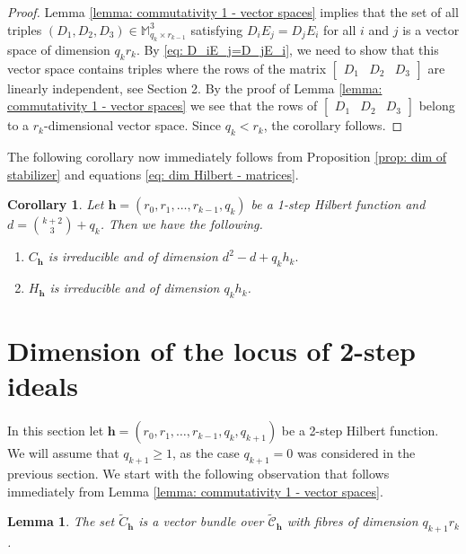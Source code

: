 \documentclass[11pt]{amsart}
\newtheorem{lemma}[thm]{Lemma}
\newtheorem{cor}[thm]{Corollary}
\theoremstyle{definition}
\newcommand{\h}{\mathbf{h}}
\newcommand{\tC}{\widetilde{C}}
\newcommand{\tcC}{\widetilde{\mathscr{C}}}
\begin{document}
\begin{proof}
Lemma \ref{lemma: commutativity 1 - vector spaces} implies that the set of all triples $(D_1,D_2,D_3)\in \mathbb{M}_{q_k\times r_{k-1}}^3$ satisfying $D_iE_j=D_jE_i$ for all $i$ and $j$ is a vector space of dimension $q_kr_k$. By \eqref{eq: D_iE_j=D_jE_i}, we need to show that this vector space contains triples where the rows of the matrix $\begin{bmatrix}D_1 & D_2 & D_3\end{bmatrix}$ are linearly independent, see Section 2. By the proof of Lemma \ref{lemma: commutativity 1 - vector spaces} we see that the rows of $\begin{bmatrix}D_1 & D_2 & D_3\end{bmatrix}$ belong to a $r_k$-dimensional vector space. Since $q_k<r_k$, the corollary follows.
\end{proof}

The following corollary now immediately follows from Proposition \ref{prop: dim of stabilizer} and equations \eqref{eq: dim Hilbert - matrices}.

\begin{cor}\label{cor: dim 1-step orbit, ideals}
Let $\h=(r_0,r_1,\ldots ,r_{k-1},q_k)$ be a 1-step Hilbert function and $d={k+2\choose 3}+q_k$. Then we have the following.
\begin{enumerate}
\item
$C_\h$ is irreducible and of dimension $d^2-d+q_kh_k.$
\item
$H_\h$ is irreducible and of dimension $q_kh_k$.
\end{enumerate}
\end{cor}


\section{Dimension of the locus of 2-step ideals}

In this section let $\h=(r_0,r_1,\ldots ,r_{k-1},q_k,q_{k+1})$ be a 2-step Hilbert function. We will assume that $q_{k+1}\ge 1$, as the case $q_{k+1}=0$ was considered in the previous section. We start with the following observation that follows immediately from Lemma \ref{lemma: commutativity 1 - vector spaces}.

\begin{lemma}\label{lemma: vector bundle over homogeneous locus}
The set $\tC_\h$ is a vector bundle over $\tcC_ \h$ with fibres of dimension $q_{k+1}r_k$.
\end{lemma}
\end{document}
